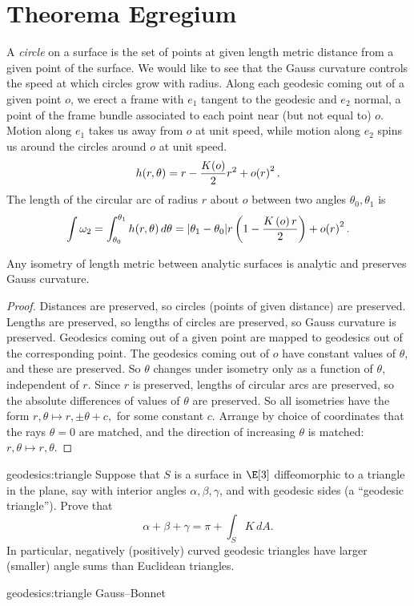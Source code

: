 \section{Theorema Egregium}
A \emph{circle} on a surface is the set of points at given length metric distance from a given point of the surface.
We would like to see that the Gauss curvature controls the speed at which circles grow with radius.
Along each geodesic coming out of a given point \(o\), we erect a frame with \(e_1\) tangent to the geodesic and \(e_2\) normal, a point of the frame bundle associated to each point near (but not equal to) \(o\).
Motion along \(e_1\) takes us away from \(o\) at unit speed, while motion along \(e_2\) spins us around the circles around \(o\) at unit speed.
\[
h(r,\theta)=r-\frac{K\!\left(o\right)}{2} r^2 + o\!\left(r\right)^2.
\]
The length of the circular arc of radius \(r\) about \(o\) between two angles \(\theta_0,\theta_1\) is
\[
\int \omega_2 = \int_{\theta_0}^{\theta_1} h(r,\theta) \, d\theta 
=
|\theta_1-\theta_0|r \left(1 - \frac{K\left(o\right)r}{2}\right) + o\!\left(r\right)^2.
\]
\begin{theorem}
Any isometry of length metric between analytic surfaces is analytic and preserves Gauss curvature.
\end{theorem}
\begin{proof}
Distances are preserved, so circles (points of given distance) are preserved. Lengths are preserved, so lengths of circles are preserved, so Gauss curvature is preserved.
Geodesics coming out of a given point are mapped to geodesics out of the corresponding point.
The geodesics coming out of \(o\) have constant values of \(\theta\), and these are preserved.
So \(\theta\) changes under isometry only as a function of \(\theta\), independent of \(r\).
Since \(r\) is preserved, lengths of circular arcs are preserved, so the absolute differences of values of \(\theta\) are preserved.
So all isometries have the form
\(
r,\theta\mapsto r,\pm\theta+c,
\)
for some constant \(c\).
Arrange by choice of coordinates that the rays \(\theta=0\) are matched, and the direction of increasing \(\theta\) is matched:
\(
r,\theta\mapsto r,\theta.
\)
\end{proof}
\begin{problem}{geodesics:triangle}
Suppose that \(S\) is a surface in \(\E[3]\) diffeomorphic to a triangle in the plane, say with interior angles \(\alpha, \beta, \gamma\), and with geodesic sides (a ``geodesic triangle'').
Prove that
\[
\alpha+\beta+\gamma= \pi + \int_S K \, dA.
\]
In particular, negatively (positively) curved geodesic triangles have larger (smaller) angle sums than Euclidean triangles.  
\end{problem}
\begin{answer}{geodesics:triangle}
Gauss--Bonnet
\end{answer}

